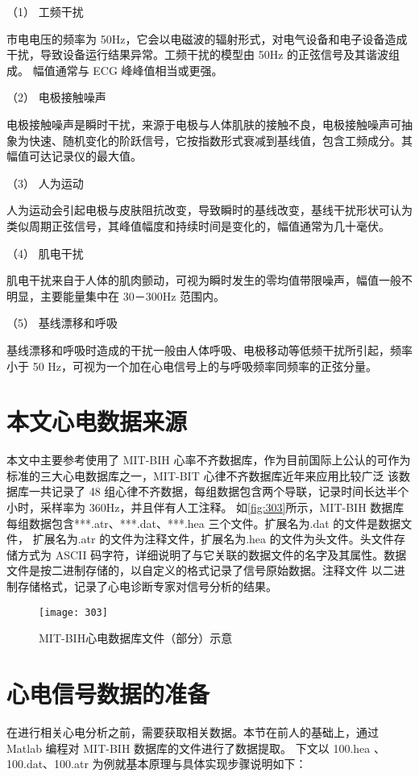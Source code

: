（1）	工频干扰 

市电电压的频率为 50Hz，它会以电磁波的辐射形式，对电气设备和电子设备造成干扰，导致设备运行结果异常。工频干扰的模型由 50Hz 的正弦信号及其谐波组成。
幅值通常与 ECG 峰峰值相当或更强。 

（2）	电极接触噪声 

电极接触噪声是瞬时干扰，来源于电极与人体肌肤的接触不良，电极接触噪声可抽象为快速、随机变化的阶跃信号，它按指数形式衰减到基线值，包含工频成分。其幅值可达记录仪的最大值。 

（3）	人为运动 

人为运动会引起电极与皮肤阻抗改变，导致瞬时的基线改变，基线干扰形状可认为类似周期正弦信号，其峰值幅度和持续时间是变化的，幅值通常为几十毫伏。 

（4）	肌电干扰 

肌电干扰来自于人体的肌肉颤动，可视为瞬时发生的零均值带限噪声，幅值一般不明显，主要能量集中在 30－300Hz 范围内。 

（5）	基线漂移和呼吸 

基线漂移和呼吸时造成的干扰一般由人体呼吸、电极移动等低频干扰所引起，频率小于 50 Hz，可视为一个加在心电信号上的与呼吸频率同频率的正弦分量。 

\section{本文心电数据来源}

本文中主要参考使用了 MIT-BIH 心率不齐数据库，作为目前国际上公认的可作为标准的三大心电数据库之一，MIT-BIT 心律不齐数据库近年来应用比较广泛
该数据库一共记录了 48 组心律不齐数据，每组数据包含两个导联，记录时间长达半个小时，采样率为 360Hz，并且伴有人工注释。 
如\autoref{fig:303}所示，MIT-BIH 数据库每组数据包含***.atr、***.dat、***.hea 三个文件。扩展名为.dat 的文件是数据文件，
扩展名为.atr 的文件为注释文件，扩展名为.hea 的文件为头文件。头文件存储方式为 ASCII 码字符，详细说明了与它关联的数据文件的名字及其属性。数据文件是按二进制存储的，以自定义的格式记录了信号原始数据。注释文件
以二进制存储格式，记录了心电诊断专家对信号分析的结果。 
\begin{figure}[htbp]
    \centering
    \texttt{[image: 303]}
    \caption{\label{fig:303}MIT-BIH心电数据库文件（部分）示意 }
\end{figure}

\section{心电信号数据的准备 }
在进行相关心电分析之前，需要获取相关数据。本节在前人的基础上\cite{10}，通过 Matlab 编程对 MIT-BIH 数据库的文件进行了数据提取。
下文以 100.hea 、100.dat、100.atr 为例就基本原理与具体实现步骤说明如下： 

